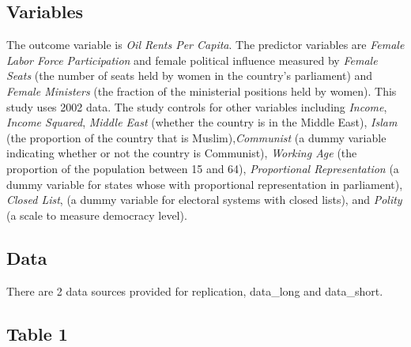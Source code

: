 \documentclass[12pt,letterpaper]{article}
\begin{document}
	\subsection*{Variables}
	
	\vspace{.25cm}
	
	\noindent The outcome variable is \textit{Oil Rents Per Capita}. The  predictor variables are \textit{Female Labor Force Participation} and female political influence measured by \textit{Female Seats} (the number of seats held by women in the country's parliament) and \textit{Female Ministers} (the fraction of the ministerial positions held by women). This study uses 2002 data. The study controls for other variables including \textit{Income}, \textit{Income Squared}, \textit{Middle East} (whether the country is in the Middle East), \textit{Islam} (the proportion of the country that is Muslim),\textit{Communist} (a dummy variable indicating whether or not the country is Communist), \textit{Working Age} (the proportion of the population between 15 and 64), \textit{Proportional Representation} (a dummy variable for states whose with proportional representation in parliament), \textit{Closed List}, (a dummy variable for electoral systems with closed lists), and \textit{Polity} (a scale to measure democracy level).

	\subsection*{Data}
	
	\vspace{.25cm}
	
	\noindent There are 2 data sources provided for replication, data\_long and data\_short.

	
	
	\subsection*{Table 1}
	
	
\end{document}
